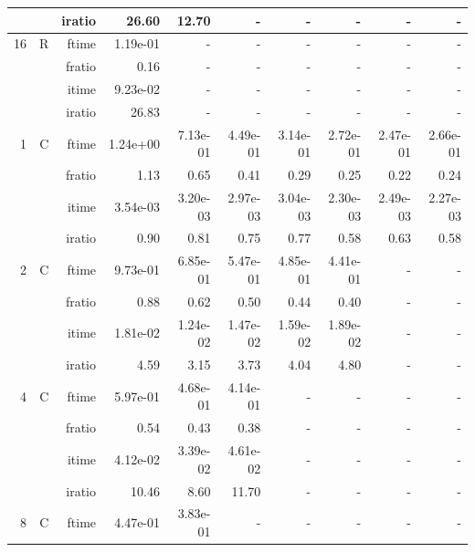 \documentclass[a4paper]{article}
\begin{document}
\begin{table}[htbp]
\begin{center}
\begin{small}
\begin{tabular}{|r|r|r|r|r|r|r|r|r|r|}
          &      & iratio & 26.60 & 12.70 &     -     &     -     &     -     &     -     &     -     \\ \hline 
     16 & R & ftime & 1.19e-01 &     -     &     -     &     -     &     -     &     -     &     -     \\   
          &      & fratio & 0.16 &     -     &     -     &     -     &     -     &     -     &     -     \\   
          &      & itime & 9.23e-02 &     -     &     -     &     -     &     -     &     -     &     -     \\   
          &      & iratio & 26.83 &     -     &     -     &     -     &     -     &     -     &     -     \\ \hline  \hline
     1 & C & ftime & 1.24e+00 & 7.13e-01 & 4.49e-01 & 3.14e-01 & 2.72e-01 & 2.47e-01 & 2.66e-01 \\   
          &      & fratio & 1.13 & 0.65 & 0.41 & 0.29 & 0.25 & 0.22 & 0.24 \\   
          &      & itime & 3.54e-03 & 3.20e-03 & 2.97e-03 & 3.04e-03 & 2.30e-03 & 2.49e-03 & 2.27e-03 \\   
          &      & iratio & 0.90 & 0.81 & 0.75 & 0.77 & 0.58 & 0.63 & 0.58 \\ \hline 
     2 & C & ftime & 9.73e-01 & 6.85e-01 & 5.47e-01 & 4.85e-01 & 4.41e-01 &     -     &     -     \\   
          &      & fratio & 0.88 & 0.62 & 0.50 & 0.44 & 0.40 &     -     &     -     \\   
          &      & itime & 1.81e-02 & 1.24e-02 & 1.47e-02 & 1.59e-02 & 1.89e-02 &     -     &     -     \\   
          &      & iratio & 4.59 & 3.15 & 3.73 & 4.04 & 4.80 &     -     &     -     \\ \hline 
     4 & C & ftime & 5.97e-01 & 4.68e-01 & 4.14e-01 &     -     &     -     &     -     &     -     \\   
          &      & fratio & 0.54 & 0.43 & 0.38 &     -     &     -     &     -     &     -     \\   
          &      & itime & 4.12e-02 & 3.39e-02 & 4.61e-02 &     -     &     -     &     -     &     -     \\   
          &      & iratio & 10.46 & 8.60 & 11.70 &     -     &     -     &     -     &     -     \\ \hline 
     8 & C & ftime & 4.47e-01 & 3.83e-01 &     -     &     -     &     -     &     -     &     -     \\   

\end{tabular}
\end{small}
\end{center}
\end{table}
\end{document}
